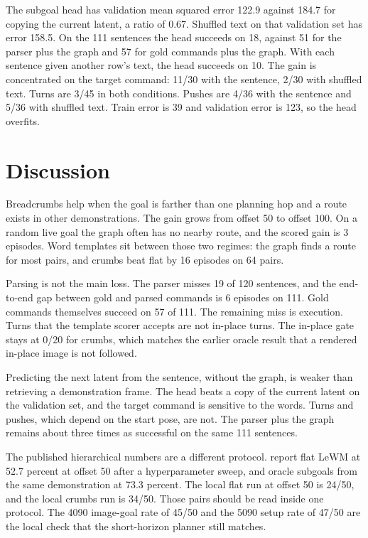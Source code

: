 \documentclass[11pt,a4paper]{article}
\begin{document}
The subgoal head has validation mean squared error 122.9 against 184.7 for copying the current latent, a ratio of 0.67.
Shuffled text on that validation set has error 158.5.
On the 111 sentences the head succeeds on 18, against 51 for the parser plus the graph and 57 for gold commands plus the graph.
With each sentence given another row's text, the head succeeds on 10.
The gain is concentrated on the target command: 11/30 with the sentence, 2/30 with shuffled text.
Turns are 3/45 in both conditions.
Pushes are 4/36 with the sentence and 5/36 with shuffled text.
Train error is 39 and validation error is 123, so the head overfits.

\section{Discussion}
Breadcrumbs help when the goal is farther than one planning hop and a route exists in other demonstrations.
The gain grows from offset 50 to offset 100.
On a random live goal the graph often has no nearby route, and the scored gain is 3 episodes.
Word templates sit between those two regimes: the graph finds a route for most pairs, and crumbs beat flat by 16 episodes on 64 pairs.

Parsing is not the main loss.
The parser misses 19 of 120 sentences, and the end-to-end gap between gold and parsed commands is 6 episodes on 111.
Gold commands themselves succeed on 57 of 111.
The remaining miss is execution.
Turns that the template scorer accepts are not in-place turns.
The in-place gate stays at 0/20 for crumbs, which matches the earlier oracle result that a rendered in-place image is not followed.

Predicting the next latent from the sentence, without the graph, is weaker than retrieving a demonstration frame.
The head beats a copy of the current latent on the validation set, and the target command is sensitive to the words.
Turns and pushes, which depend on the start pose, are not.
The parser plus the graph remains about three times as successful on the same 111 sentences.

The published hierarchical numbers are a different protocol.
\citet{caselli2026hilewm} report flat LeWM at 52.7 percent at offset 50 after a hyperparameter sweep, and oracle subgoals from the same demonstration at 73.3 percent.
The local flat run at offset 50 is 24/50, and the local crumbs run is 34/50.
Those pairs should be read inside one protocol.
The 4090 image-goal rate of 45/50 and the 5090 setup rate of 47/50 are the local check that the short-horizon planner still matches.
\end{document}
